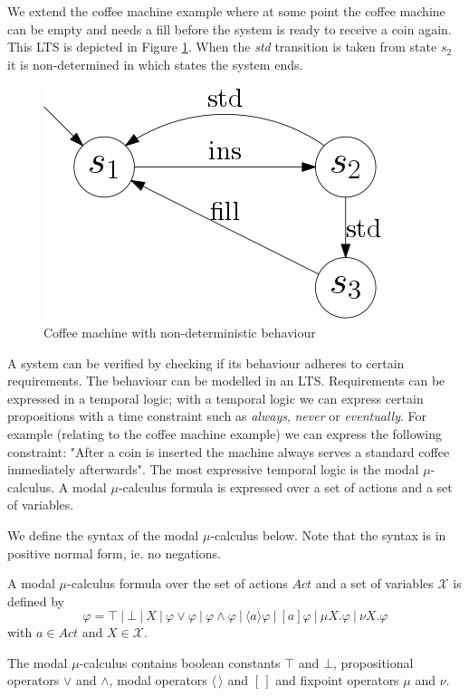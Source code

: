 \begin{example}
	We extend the coffee machine example where at some point the coffee machine can be empty and needs a fill before the system is ready to receive a coin again. This LTS is depicted in Figure \ref{fig:coffeemachineundeterministic}. When the \textit{std} transition is taken from state $s_2$ it is non-determined in which states the system ends.
	\begin{figure}[h]
		\centering
		\includegraphics[scale=0.3]{Examples/CoffeeMachine/NonDeterministicEuroLTS}
		\caption[Coffee machine LTS]{Coffee machine with non-deterministic behaviour}
		\label{fig:coffeemachineundeterministic}
	\end{figure}
\end{example}


A system can be verified by checking if its behaviour adheres to certain requirements. The behaviour can be modelled in an LTS. Requirements can be expressed in a temporal logic; with a temporal logic we can express certain propositions with a time constraint such as \textit{always}, \textit{never} or \textit{eventually}. For example (relating to the coffee machine example) we can express the following constraint: "After a coin is inserted the machine always serves a standard coffee immediately afterwards". The most expressive temporal logic is the modal $\mu$-calculus. A modal $\mu$-calculus formula is expressed over a set of actions and a set of variables.

We define the syntax of the modal $\mu$-calculus below. Note that the syntax is in positive normal form, ie. no negations.
\begin{definition}
	\label{def_mu_syntax}
	A modal $\mu$-calculus formula over the set of actions $Act$ and a set of variables $\mathcal{X}$ is defined by
	\[ \varphi = \top\ |\ \bot\ |\ X\ |\ \varphi \vee \varphi\ |\ \varphi \wedge \varphi\ |\ \langle a \rangle \varphi\ |\ [a]\varphi\ |\ \mu X.\varphi\ |\ \nu X.\varphi \]
	with $a \in Act$ and $X \in \mathcal{X}$. 
\end{definition}
The modal $\mu$-calculus contains boolean constants $\top$ and $\bot$, propositional operators $\vee$ and $\wedge$, modal operators $\langle \, \rangle$ and $[ \, ]$ and fixpoint operators $\mu$ and $\nu$. 

